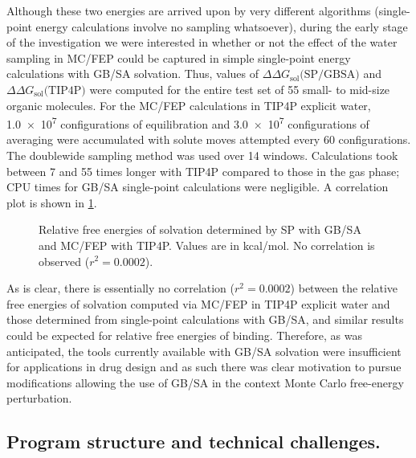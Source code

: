 \documentclass[12pt]{report}
\begin{document}
Although these two energies are arrived upon by very different algorithms (single-point energy calculations involve no sampling whatsoever), during the early stage of the investigation we were interested in whether or not the effect of the water sampling in MC/FEP could be captured in simple single-point energy calculations with GB/SA solvation. Thus, values of $\Delta\Delta G_{\textrm{sol}}\textrm{(SP/GBSA)}$ and $\Delta\Delta G_{\textrm{sol}}\textrm{(TIP4P)}$ were computed for the entire test set of 55 small- to mid-size organic molecules. For the MC/FEP calculations in TIP4P explicit water, \num{1.0e7} configurations of equilibration and \num{3.0e7} configurations of averaging were accumulated with solute moves attempted every 60 configurations. The doublewide sampling method was used over 14 windows. Calculations took between 7 and 55 times longer with TIP4P compared to those in the gas phase; CPU times for GB/SA single-point calculations were negligible. A correlation plot is shown in \cref{precorr}. 

\begin{figure}[b!]
\centering

\caption{Relative free energies of solvation determined by SP with GB/SA and MC/FEP with TIP4P. Values are in kcal/mol. No correlation is observed ($r^{2} = 0.0002$).}
\label{precorr}
\end{figure}

As is clear, there is essentially no correlation ($r^{2} = 0.0002$) between the relative free energies of solvation computed via MC/FEP in TIP4P explicit water and those determined from single-point calculations with GB/SA, and similar results could be expected for relative free energies of binding. Therefore, as was anticipated, the tools currently available with GB/SA solvation were insufficient for applications in drug design and as such there was clear motivation to pursue modifications allowing the use of GB/SA in the context Monte Carlo free-energy perturbation.


\subsection{Program structure and technical challenges.}
\end{document}
